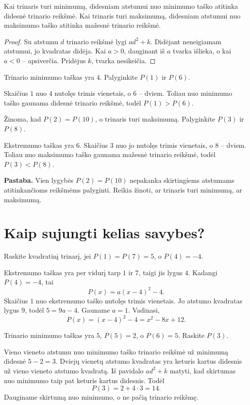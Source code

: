 \documentclass[11pt,a4paper]{scrartcl}
\newcommand{\pv}[2]{\begin{example}\label{#1}#2\end{example}}
\begin{document}
\begin{property}\label{prop:compare}
Kai trinaris turi minimumą, didesniam atstumui nuo minimumo taško atitinka didesnė trinario reikšmė. Kai trinaris turi maksimumą, didesniam atstumui nuo maksimumo taško atitinka mažesnė trinario reikšmė.
\end{property}
\begin{proof}
Su atstumu $d$ trinario reikšmė lygi $ad^2+k$. Didėjant neneigiamam atstumui, jo kvadratas didėja. Kai $a>0$, dauginant iš $a$ tvarka išlieka, o kai $a<0$ -- apsiverčia. Pridėjus $k$, tvarka nesikeičia.
\end{proof}
\pv{pv:min}{Trinario minimumo taškas yra $4$. Palyginkite $P(1)$ ir $P(6)$.}
\begin{solution}
Skaičius $1$ nuo $4$ nutolęs trimis vienetais, o $6$ -- dviem. Toliau nuo minimumo taško gaunama didesnė trinario reikšmė, todėl $P(1)>P(6)$.
\end{solution}
\pv{pv:max}{Žinoma, kad $P(2)=P(10)$, o trinaris turi maksimumą. Palyginkite $P(3)$ ir $P(8)$.}
\begin{solution}
Ekstremumo taškas yra $6$. Skaičius $3$ nuo jo nutolęs trimis vienetais, o $8$ -- dviem. Toliau nuo maksimumo taško gaunama mažesnė trinario reikšmė, todėl $P(3)<P(8)$.
\end{solution}
\textbf{Pastaba.} Vien lygybės $P(2)=P(10)$ nepakanka skirtingiems atstumams atitinkančioms reikšmėms palyginti. Reikia žinoti, ar trinaris turi minimumą, ar maksimumą.

\newpage
\section{Kaip sujungti kelias savybes?}
\pv{pv:restore}{Raskite kvadratinį trinarį, jei $P(1)=P(7)=5$, o $P(4)=-4$.}
\begin{solution}
Ekstremumo taškas yra per vidurį tarp $1$ ir $7$, taigi jis lygus $4$. Kadangi $P(4)=-4$, tai
\[P(x)=a(x-4)^2-4.\]
Skaičius $1$ nuo ekstremumo taško nutolęs trimis vienetais. Jo atstumo kvadratas lygus $9$, todėl $5=9a-4$. Gauname $a=1$. Vadinasi,
\[P(x)=(x-4)^2-4=x^2-8x+12.\]
\end{solution}
\pv{pv:distance-square}{Trinario minimumo taškas yra $5$, $P(5)=2$, o $P(6)=5$. Raskite $P(3)$.}
\begin{solution}
Vieno vieneto atstumu nuo minimumo taško trinario reikšmė už minimumą didesnė $5-2=3$. Dviejų vienetų atstumo kvadratas yra keturis kartus didesnis už vieno vieneto atstumo kvadratą. Iš pavidalo $ad^2+k$ matyti, kad skirtumas nuo minimumo taip pat keturis kartus didesnis. Todėl
\[P(3)=2+4\cdot3=14.\]
Dauginame skirtumą nuo minimumo, o ne pačią trinario reikšmę.
\end{solution}
\end{document}
